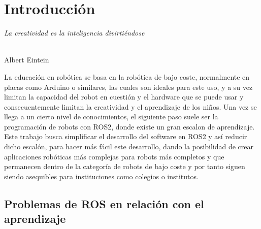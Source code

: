 \chapter{Introducción}
\label{cap:capitulo1}
\setcounter{page}{1}

\begin{flushright}
\begin{minipage}[]{10cm}
\emph{La creatividad es la inteligencia divirtiéndose}\\
\end{minipage}\\

Albert Eintein\\
\end{flushright}

\vspace{1cm}

La educación en robótica se basa en la robótica de bajo coste, normalmente en
placas como Arduino o similares, las cuales son ideales para este uso, y a su
vez limitan la capacidad del robot en cuestión y el hardware que se puede usar y
consecuentemente limitan la creatividad y el aprendizaje de los niños. Una vez
se llega a un cierto nivel de conocimientos, el siguiente paso suele ser la
programación de robots con ROS2, donde existe un gran escalon de aprendizaje.
Este trabajo busca simplificar el desarrollo del software en ROS2 y así reducir
dicho escalón, para hacer más fácil este desarrollo, dando la posibilidad de
crear aplicaciones robóticas más complejas para robots más completos y que
permanecen dentro de la categoría de robots de bajo coste y por tanto siguen
siendo asequibles para instituciones como colegios o institutos.\\


\section{Problemas de ROS en relación con el aprendizaje}
\label{sec:miseccion} %

